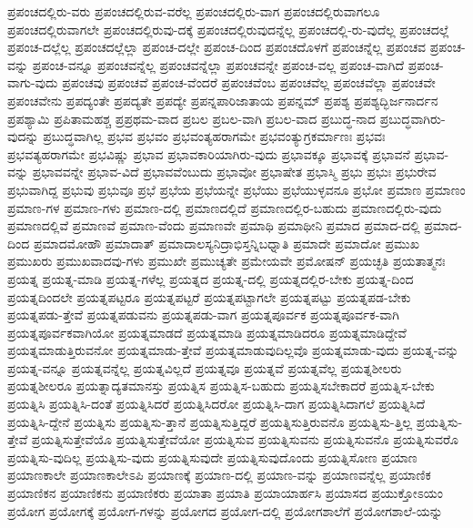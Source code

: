 {ಪ್ರಪಂಚದಲ್ಲಿರು-ವರು
ಪ್ರಪಂಚದಲ್ಲಿರುವ-ವರೆಲ್ಲ
ಪ್ರಪಂಚದಲ್ಲಿರು-ವಾಗ
ಪ್ರಪಂಚದಲ್ಲಿರುವಾಗಲೂ
ಪ್ರಪಂಚದಲ್ಲಿರುವಾಗಲೇ
ಪ್ರಪಂಚದಲ್ಲಿರುವು-ದಕ್ಕೆ
ಪ್ರಪಂಚದಲ್ಲಿರುವುದನ್ನೆಲ್ಲ
ಪ್ರಪಂಚದಲ್ಲಿ-ರು-ವುದೆಲ್ಲ
ಪ್ರಪಂಚದಲ್ಲೆ
ಪ್ರಪಂಚ-ದಲ್ಲೆಲ್ಲ
ಪ್ರಪಂಚದಲ್ಲೆಲ್ಲಾ
ಪ್ರಪಂಚ-ದಲ್ಲೇ
ಪ್ರಪಂಚ-ದಿಂದ
ಪ್ರಪಂಚದೊಳಗೆ
ಪ್ರಪಂಚನ್ನೆಲ್ಲ
ಪ್ರಪಂಚವ
ಪ್ರಪಂಚ-ವನ್ನು
ಪ್ರಪಂಚ-ವನ್ನೂ
ಪ್ರಪಂಚವನ್ನೆಲ್ಲ
ಪ್ರಪಂಚವನ್ನೆಲ್ಲಾ
ಪ್ರಪಂಚವನ್ನೇ
ಪ್ರಪಂಚ-ವಲ್ಲ
ಪ್ರಪಂಚ-ವಾಗಿದೆ
ಪ್ರಪಂಚ-ವಾಗು-ವುದು
ಪ್ರಪಂಚವು
ಪ್ರಪಂಚವೆ
ಪ್ರಪಂಚ-ವೆಂದರೆ
ಪ್ರಪಂಚವೆಂಬ
ಪ್ರಪಂಚವೆಲ್ಲ
ಪ್ರಪಂಚವೆಲ್ಲಾ
ಪ್ರಪಂಚವೇ
ಪ್ರಪಂಚವೇನು
ಪ್ರಪದ್ಯಂತೇ
ಪ್ರಪದ್ಯತೇ
ಪ್ರಪದ್ಯೇ
ಪ್ರಪನ್ನಪಾರಿಜಾತಾಯ
ಪ್ರಪನ್ನಮ್
ಪ್ರಪಶ್ಯ
ಪ್ರಪಶ್ಯದ್ಭಿರ್ಜನಾರ್ದನ
ಪ್ರಪಶ್ಯಾಮಿ
ಪ್ರಪಿತಾಮಹಶ್ಚ
ಪ್ರಪ್ರಥಮ-ವಾದ
ಪ್ರಬಲ
ಪ್ರಬಲ-ವಾಗಿ
ಪ್ರಬಲ-ವಾದ
ಪ್ರಬುದ್ಧ-ನಾದ
ಪ್ರಬುದ್ಧವಾಗಿರು-ವುದನ್ನು
ಪ್ರಬುದ್ಧವಾಗಿಲ್ಲ
ಪ್ರಭವ
ಪ್ರಭವಂ
ಪ್ರಭವಂತ್ಯಹರಾಗಮೇ
ಪ್ರಭವಂತ್ಯುಗ್ರಕರ್ಮಾಣಃ
ಪ್ರಭವಃ
ಪ್ರಭವತ್ಯಹರಾಗಮೇ
ಪ್ರಭವಿಷ್ಣು
ಪ್ರಭಾವ
ಪ್ರಭಾವಕಾರಿಯಾಗಿರು-ವುದು
ಪ್ರಭಾವಕ್ಕೂ
ಪ್ರಭಾವಕ್ಕೆ
ಪ್ರಭಾವನೆ
ಪ್ರಭಾವ-ವನ್ನು
ಪ್ರಭಾವವನ್ನೇ
ಪ್ರಭಾವ-ವಿದೆ
ಪ್ರಭಾವವೆಂಬುದು
ಪ್ರಭಾವೋ
ಪ್ರಭಾಷೇತ
ಪ್ರಭಾಸ್ಮಿ
ಪ್ರಭು
ಪ್ರಭುಃ
ಪ್ರಭುರೇವ
ಪ್ರಭುವಾಗಿದ್ದ
ಪ್ರಭುವು
ಪ್ರಭುವೂ
ಪ್ರಭೆ
ಪ್ರಭೆಯ
ಪ್ರಭೆಯನ್ನೇ
ಪ್ರಭೆಯು
ಪ್ರಭೆಯುಳ್ಳವನೂ
ಪ್ರಭೋ
ಪ್ರಮಾಣ
ಪ್ರಮಾಣಂ
ಪ್ರಮಾಣ-ಗಳ
ಪ್ರಮಾಣ-ಗಳು
ಪ್ರಮಾಣ-ದಲ್ಲಿ
ಪ್ರಮಾಣದಲ್ಲಿದೆ
ಪ್ರಮಾಣದಲ್ಲಿರ-ಬಹುದು
ಪ್ರಮಾಣದಲ್ಲಿರು-ವುದು
ಪ್ರಮಾಣದಲ್ಲಿವೆ
ಪ್ರಮಾಣವೆ
ಪ್ರಮಾಣ-ವೆಂದು
ಪ್ರಮಾಣವೇ
ಪ್ರಮಾಥಿ
ಪ್ರಮಾಥೀನಿ
ಪ್ರಮಾದ
ಪ್ರಮಾದ-ದಲ್ಲಿ
ಪ್ರಮಾದ-ದಿಂದ
ಪ್ರಮಾದಮೋಹೌ
ಪ್ರಮಾದಾತ್
ಪ್ರಮಾದಾಲಸ್ಯನಿದ್ರಾಭಿಸ್ತನ್ನಿಬಧ್ನಾತಿ
ಪ್ರಮಾದೇ
ಪ್ರಮಾದೋ
ಪ್ರಮುಖ
ಪ್ರಮುಖರು
ಪ್ರಮುಖವಾದವು-ಗಳು
ಪ್ರಮುಖೇ
ಪ್ರಮುಚ್ಯತೇ
ಪ್ರಮೇಯವೇ
ಪ್ರಮೋಷನ್
ಪ್ರಯಚ್ಛತಿ
ಪ್ರಯತಾತ್ಮನಃ
ಪ್ರಯತ್ನ
ಪ್ರಯತ್ನ-ಮಾಡಿ
ಪ್ರಯತ್ನ-ಗಳೆಲ್ಲ
ಪ್ರಯತ್ನದ
ಪ್ರಯತ್ನ-ದಲ್ಲಿ
ಪ್ರಯತ್ನದಲ್ಲಿರ-ಬೇಕು
ಪ್ರಯತ್ನ-ದಿಂದ
ಪ್ರಯತ್ನದಿಂದಲೇ
ಪ್ರಯತ್ನಪಟ್ಟರೂ
ಪ್ರಯತ್ನಪಟ್ಟರೆ
ಪ್ರಯತ್ನಪಟ್ಟಾಗಲೇ
ಪ್ರಯತ್ನಪಟ್ಟು
ಪ್ರಯತ್ನಪಡ-ಬೇಕು
ಪ್ರಯತ್ನಪಡು-ತ್ತೇವೆ
ಪ್ರಯತ್ನಪಡುವನು
ಪ್ರಯತ್ನಪಡು-ವಾಗ
ಪ್ರಯತ್ನಪೂರ್ವಕ
ಪ್ರಯತ್ನಪೂರ್ವಕ-ವಾಗಿ
ಪ್ರಯತ್ನಪೂರ್ವಕವಾಗಿಯೋ
ಪ್ರಯತ್ನಮಾಡದೆ
ಪ್ರಯತ್ನಮಾಡಿ
ಪ್ರಯತ್ನಮಾಡಿದರೂ
ಪ್ರಯತ್ನಮಾಡಿದ್ದೇವೆ
ಪ್ರಯತ್ನಮಾಡುತ್ತಿರುವನೋ
ಪ್ರಯತ್ನಮಾಡು-ತ್ತೇವೆ
ಪ್ರಯತ್ನಮಾಡುವುದಿಲ್ಲವೊ
ಪ್ರಯತ್ನಮಾಡು-ವುದು
ಪ್ರಯತ್ನ-ವನ್ನು
ಪ್ರಯತ್ನ-ವನ್ನೂ
ಪ್ರಯತ್ನವನ್ನೆಲ್ಲ
ಪ್ರಯತ್ನವಿಲ್ಲದೆ
ಪ್ರಯತ್ನವೂ
ಪ್ರಯತ್ನವೆ
ಪ್ರಯತ್ನವೆಲ್ಲ
ಪ್ರಯತ್ನಶೀಲರು
ಪ್ರಯತ್ನಶೀಲರೂ
ಪ್ರಯತ್ನಾದ್ಯತಮಾನಸ್ತು
ಪ್ರಯತ್ನಿಸ
ಪ್ರಯತ್ನಿಸ-ಬಹುದು
ಪ್ರಯತ್ನಿಸಬೇಕಾದರೆ
ಪ್ರಯತ್ನಿಸ-ಬೇಕು
ಪ್ರಯತ್ನಿಸಿ
ಪ್ರಯತ್ನಿಸಿ-ದಂತೆ
ಪ್ರಯತ್ನಿಸಿದರೆ
ಪ್ರಯತ್ನಿಸಿದರೋ
ಪ್ರಯತ್ನಿಸಿ-ದಾಗ
ಪ್ರಯತ್ನಿಸಿದಾಗಲೆ
ಪ್ರಯತ್ನಿಸಿದೆ
ಪ್ರಯತ್ನಿಸಿ-ದ್ದೇನೆ
ಪ್ರಯತ್ನಿಸು
ಪ್ರಯತ್ನಿಸು-ತ್ತಾನೆ
ಪ್ರಯತ್ನಿಸುತ್ತಿದ್ದರೆ
ಪ್ರಯತ್ನಿಸುತ್ತಿರುವನೊ
ಪ್ರಯತ್ನಿಸು-ತ್ತಿಲ್ಲ
ಪ್ರಯತ್ನಿಸು-ತ್ತೇವೆ
ಪ್ರಯತ್ನಿಸುತ್ತೇವೆಯೊ
ಪ್ರಯತ್ನಿಸುತ್ತೇವೆಯೋ
ಪ್ರಯತ್ನಿಸುವ
ಪ್ರಯತ್ನಿಸುವನು
ಪ್ರಯತ್ನಿಸುವನೊ
ಪ್ರಯತ್ನಿಸುವರೊ
ಪ್ರಯತ್ನಿಸು-ವುದಿಲ್ಲ
ಪ್ರಯತ್ನಿಸು-ವುದು
ಪ್ರಯತ್ನಿಸುವುದೇ
ಪ್ರಯತ್ನಿಸುವುದೊಂದು
ಪ್ರಯತ್ನಿಸೋಣ
ಪ್ರಯಾಣ
ಪ್ರಯಾಣಕಾಲೇ
ಪ್ರಯಾಣಕಾಲೇಽಪಿ
ಪ್ರಯಾಣಕ್ಕೆ
ಪ್ರಯಾಣ-ದಲ್ಲಿ
ಪ್ರಯಾಣ-ವನ್ನು
ಪ್ರಯಾಣವನ್ನೆಲ್ಲ
ಪ್ರಯಾಣಿಕ
ಪ್ರಯಾಣಿಕನ
ಪ್ರಯಾಣಿಕನು
ಪ್ರಯಾಣಿಕರು
ಪ್ರಯಾತಾ
ಪ್ರಯಾತಿ
ಪ್ರಯಾಯಾರ್ಹಸಿ
ಪ್ರಯಾಸದ
ಪ್ರಯುಕ್ತೋಽಯಂ
ಪ್ರಯೋಗ
ಪ್ರಯೋಗಕ್ಕೆ
ಪ್ರಯೋಗ-ಗಳನ್ನು
ಪ್ರಯೋಗದ
ಪ್ರಯೋಗ-ದಲ್ಲಿ
ಪ್ರಯೋಗಶಾಲೆಗೆ
ಪ್ರಯೋಗಶಾಲೆ-ಯನ್ನು
}
